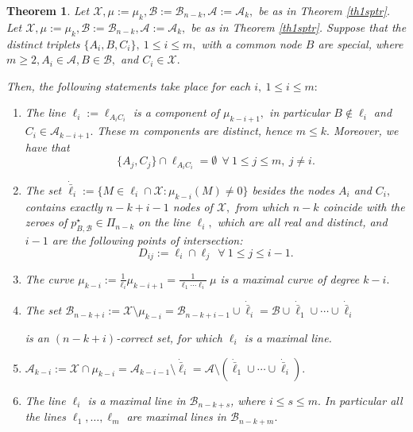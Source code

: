\documentclass[a4paper,12pt]{article}
\newtheorem{theorem}[lemma]{Theorem}
\theoremstyle{definition}
\numberwithin{equation}{section}
\numberwithin{figure}{section}
\newcommand{\Aset}{\mathcal{A}}
\newcommand{\Bset}{\mathcal{B}}
\newcommand{\Xset}{\mathcal{X}}
\begin{document}
\begin{theorem}\label{prp:m2ket}
Let $\Xset, \mu:=\mu_k, \Bset:=\Bset_{n-k},\Aset:=\Aset_{k},$ be as in Theorem \ref{th1sptr}.
Let $\Xset, \mu:=\mu_k, \Bset:=\Bset_{n-k},\Aset:=\Aset_{k},$ be as in Theorem \ref{th1sptr}. Suppose that the distinct triplets $\{A_i,B,C_i\},\  1\le i\le m,$ with a common node $B$ are special, where $m\ge 2, A_i \in \Aset, B\in \Bset,$ and $C_i \in \Xset.$ 

Then, the following statements take place for each $i,\ 1\le i\le m:$
\begin{enumerate}
\setlength{\itemsep}{0mm}
\item
The line $\ell_i:=\ell_{A_iC_i}$ is a component of $\mu_{k-i+1},$ in particular  $B\notin\ell_i$ and $C_i\in\Aset_{k-i+1}.$  These $m$ components are distinct, hence $m\le k.$ Moreover, we have that
$$\{A_j,C_j\}\cap\ell_{A_iC_i} =\emptyset\ \ \forall\ 1\le j\le m,\ j\neq i.$$
\item
The set $\dot{\bar\ell}_i:=\{M\in{\ell_i}\cap  \Xset: \mu_{k-i}(M)\neq 0\}$ besides the nodes $A_i$ and $C_i,$ contains exactly $n-k+i-1$ nodes of $\Xset,$ from which $n-k$ coincide with the zeroes of $p^\star_{B,\Bset}\in\Pi_{n-k}$ on the line $\ell_i,$ which are all real and distinct, and $i-1$ are the following points of intersection: 
$$D_{ij}:=\ell_i\cap\ell_j\ \ \forall\ 1\le j \le i-1.$$ 
\item
The curve $\mu_{k-i}:=\frac{1}{{\ell_i}}\mu_{k-i+1}=\frac{1}{\ell_1\cdots\ell_i}\ \mu$  is a maximal curve of degree $k-i.$  
\item
The set  
$\Bset_{n-k+i}:=\Xset\setminus\mu_{k-i}=\Bset_{n-k+i-1}\cup \dot{\bar\ell}_i=\Bset\cup\dot{\bar\ell}_1\cup\cdots\cup\dot{\bar\ell}_i
$ 

is an  $(n-k+i)$-correct set, for which $\ell_i$ is a maximal line.
\item
$\Aset_{k-i}:=\Xset\cap\mu_{k-i}=\Aset_{k-i-1}\setminus\dot{\bar \ell}_i=\Aset\setminus (\dot{\bar \ell}_1\cup\cdots\cup\dot{\bar \ell}_i).$ 

\item
The line $\ell_i$ is a maximal line in  $\Bset_{n-k+s}$, where $i\le s\le m.$ In particular all the lines $\ell_1,\ldots,\ell_m$ are maximal lines in $\Bset_{n-k+m}.$
 \end{enumerate}
\end{theorem}
\end{document}
